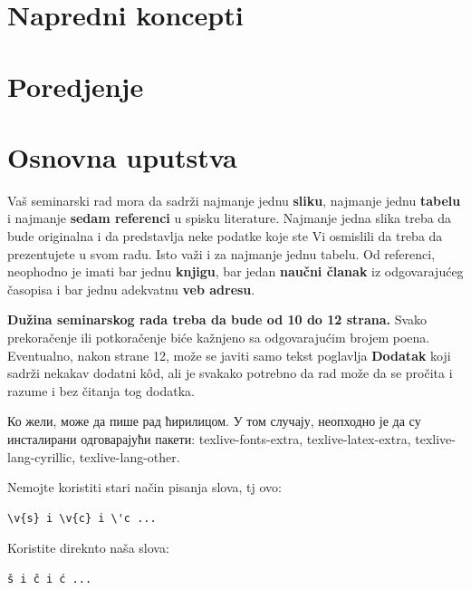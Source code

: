 \documentclass[a4paper]{article}
\begin{document}
\section{Napredni koncepti}

\section{Poredjenje}




\section{Osnovna uputstva}
Vaš seminarski rad mora da sadrži najmanje jednu \textbf{sliku}, najmanje jednu \textbf{tabelu} i najmanje \textbf{sedam referenci} u spisku literature. Najmanje jedna slika treba da bude originalna i da predstavlja neke podatke koje ste Vi osmislili da treba da prezentujete u svom radu. Isto važi i za najmanje jednu tabelu. 	Od referenci, neophodno je imati bar jednu \textbf{knjigu}, bar jedan \textbf{naučni članak} iz odgovarajućeg časopisa i bar jednu adekvatnu \textbf{veb adresu}. 

\textbf{Dužina seminarskog rada treba da bude od 10 do 12 strana.} Svako prekoračenje ili potkoračenje biće kažnjeno sa odgovarajućim brojem poena. Eventualno, nakon strane 12, može se javiti samo tekst poglavlja \textbf{Dodatak} koji sadrži nekakav dodatni k\^{o}d, ali je svakako potrebno da rad može da se pročita i razume i bez čitanja tog dodatka. 

Ко жели, може да пише рад ћирилицом. У том случају, неопходно је да су инсталирани одговарајући пакети: texlive-fonts-extra, texlive-latex-extra, texlive-lang-cyrillic, texlive-lang-other. 

Nemojte koristiti stari način pisanja slova, tj ovo:
\begin{verbatim}
\v{s} i \v{c} i \'c ...
\end{verbatim}
Koristite direknto naša slova:	
\begin{verbatim}
š i č i ć ... 
\end{verbatim}
\end{document}
